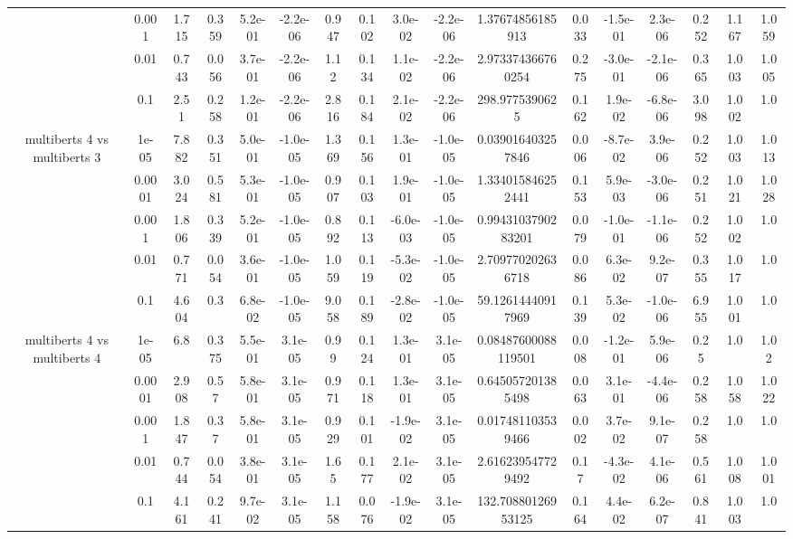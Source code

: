 \begin{tabular}{|c|c|c|c|c|c|c|c|c|c|c|c|c|c|c|c|c|}
 & 0.001 & 1.715 & 0.359 & 5.2e-01 & -2.2e-06 & 0.947 & 0.102 & 3.0e-02 & -2.2e-06 & 1.37674856185913 & 0.033 & -1.5e-01 & 2.3e-06 & 0.252 & 1.167 & 1.059 \\
 & 0.01 & 0.743 & 0.056 & 3.7e-01 & -2.2e-06 & 1.12 & 0.134 & 1.1e-02 & -2.2e-06 & 2.973374366760254 & 0.275 & -3.0e-01 & -2.1e-06 & 0.365 & 1.003 & 1.005 \\
 & 0.1 & 2.51 & 0.258 & 1.2e-01 & -2.2e-06 & 2.816 & 0.184 & 2.1e-02 & -2.2e-06 & 298.9775390625 & 0.162 & 1.9e-02 & -6.8e-06 & 3.098 & 1.002 & 1.0 \\
\hline
\multirow{5}{*}{multiberts 4 vs multiberts 3} & 1e-05 & 7.882 & 0.351 & 5.0e-01 & -1.0e-05 & 1.369 & 0.156 & 1.3e-01 & -1.0e-05 & 0.039016403257846 & 0.006 & -8.7e-02 & 3.9e-06 & 0.252 & 1.003 & 1.013 \\
 & 0.0001 & 3.024 & 0.581 & 5.3e-01 & -1.0e-05 & 0.907 & 0.103 & 1.9e-01 & -1.0e-05 & 1.334015846252441 & 0.153 & 5.9e-03 & -3.0e-06 & 0.251 & 1.021 & 1.028 \\
 & 0.001 & 1.806 & 0.339 & 5.2e-01 & -1.0e-05 & 0.892 & 0.113 & -6.0e-03 & -1.0e-05 & 0.9943103790283201 & 0.079 & -1.0e-01 & -1.1e-06 & 0.252 & 1.002 & 1.0 \\
 & 0.01 & 0.771 & 0.054 & 3.6e-01 & -1.0e-05 & 1.059 & 0.119 & -5.3e-02 & -1.0e-05 & 2.709770202636718 & 0.086 & 6.3e-02 & 9.2e-07 & 0.355 & 1.017 & 1.0 \\
 & 0.1 & 4.604 & 0.3 & 6.8e-02 & -1.0e-05 & 9.058 & 0.189 & -2.8e-02 & -1.0e-05 & 59.12614440917969 & 0.139 & 5.3e-02 & -1.0e-06 & 6.955 & 1.001 & 1.0 \\
\hline
\multirow{5}{*}{multiberts 4 vs multiberts 4} & 1e-05 & 6.8 & 0.375 & 5.5e-01 & 3.1e-05 & 0.99 & 0.124 & 1.3e-01 & 3.1e-05 & 0.08487600088119501 & 0.008 & -1.2e-01 & 5.9e-06 & 0.25 & 1.0 & 1.02 \\
 & 0.0001 & 2.908 & 0.57 & 5.8e-01 & 3.1e-05 & 0.971 & 0.118 & 1.3e-01 & 3.1e-05 & 0.645057201385498 & 0.063 & 3.1e-01 & -4.4e-06 & 0.258 & 1.058 & 1.022 \\
 & 0.001 & 1.847 & 0.37 & 5.8e-01 & 3.1e-05 & 0.929 & 0.101 & -1.9e-02 & 3.1e-05 & 0.017481103539466 & 0.002 & 3.7e-02 & 9.1e-07 & 0.258 & 1.0 & 1.0 \\
 & 0.01 & 0.744 & 0.054 & 3.8e-01 & 3.1e-05 & 1.65 & 0.177 & 2.1e-02 & 3.1e-05 & 2.616239547729492 & 0.17 & -4.3e-02 & 4.1e-06 & 0.561 & 1.008 & 1.001 \\
 & 0.1 & 4.161 & 0.241 & 9.7e-02 & 3.1e-05 & 1.158 & 0.076 & -1.9e-02 & 3.1e-05 & 132.70880126953125 & 0.164 & 4.4e-02 & 6.2e-07 & 0.841 & 1.003 & 1.0 \\

\end{tabular}
